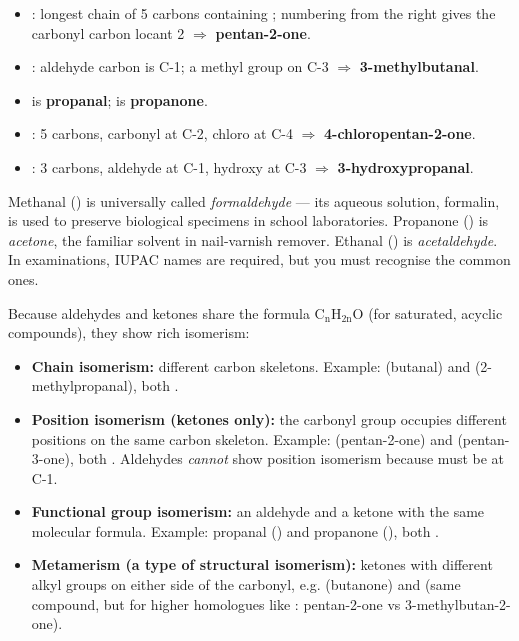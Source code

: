 \documentclass[11pt]{article}
\newcounter{popsec}
\newcounter{popsub}
\newcommand{\courssub}[1]{%
  \stepcounter{popsub}%
  \par\vspace{9pt}\noindent{\popxbold\fontsize{11.5}{13}\selectfont\color{popink}{\color{poporange}\thepopsec.\thepopsub}\hspace{6pt}#1}\par\nopagebreak\vspace{4pt}
}
\begin{document}
\begin{exemplebox}
\begin{itemize}
\item {}: longest chain of 5 carbons containing ; numbering from the right gives the carbonyl carbon locant 2 $\Rightarrow$ \textbf{pentan-2-one}.
\item {}: aldehyde carbon is C-1; a methyl group on C-3 $\Rightarrow$ \textbf{3-methylbutanal}.
\item {} is \textbf{propanal};  is \textbf{propanone}.
\item {}: 5 carbons, carbonyl at C-2, chloro at C-4 $\Rightarrow$ \textbf{4-chloropentan-2-one}.
\item {}: 3 carbons, aldehyde at C-1, hydroxy at C-3 $\Rightarrow$ \textbf{3-hydroxypropanal}.
\end{itemize}
\end{exemplebox}

\begin{savaistu}
Methanal () is universally called \emph{formaldehyde} — its aqueous solution, formalin, is used to preserve biological specimens in school laboratories. Propanone () is \emph{acetone}, the familiar solvent in nail-varnish remover. Ethanal () is \emph{acetaldehyde}. In examinations, IUPAC names are required, but you must recognise the common ones.
\end{savaistu}

\courssub{Isomerism in Aldehydes and Ketones}

Because aldehydes and ketones share the formula \ensuremath{\mathrm{C_nH_{2n}O}} (for saturated, acyclic compounds), they show rich isomerism:

\begin{itemize}
\item \textbf{Chain isomerism:} different carbon skeletons. Example:  (butanal) and  (2-methylpropanal), both .
\item \textbf{Position isomerism (ketones only):} the carbonyl group occupies different positions on the same carbon skeleton. Example:  (pentan-2-one) and  (pentan-3-one), both . Aldehydes \emph{cannot} show position isomerism because  must be at C-1.
\item \textbf{Functional group isomerism:} an aldehyde and a ketone with the same molecular formula. Example: propanal () and propanone (), both .
\item \textbf{Metamerism (a type of structural isomerism):} ketones with different alkyl groups on either side of the carbonyl, e.g.  (butanone) and  (same compound, but for higher homologues like : pentan-2-one vs 3-methylbutan-2-one).
\end{itemize}
\end{document}
